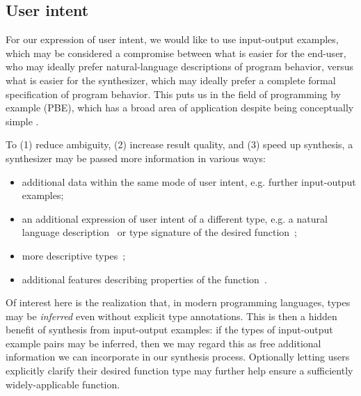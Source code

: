 \documentclass{article} %
\begin{document}

\subsection{User intent}

For our expression of user intent, we would like to use input-output examples,
which may be considered a compromise between what is easier for the end-user,
who may ideally prefer natural-language descriptions of program behavior,
versus what is easier for the synthesizer,
which may ideally prefer a complete formal specification of program behavior.
This puts us in the field of programming by example (PBE),
which has a broad area of application despite being conceptually simple%
.

To (1) reduce ambiguity, (2) increase result quality, and (3) speed up synthesis, a synthesizer may be passed more information in various ways:
\begin{itemize}
    \item additional data within the same mode of user intent, e.g. further input-output examples;
    \item an additional expression of user intent of a different type, e.g. a natural language description~\citep{polosukhin2018neural} or type signature of the desired function~\citep{myth};
    \item more descriptive types~\citep{synquid};
    \item additional features describing properties of the function~\citep{odena2020learning}.
\end{itemize}

Of interest here is the realization that, in modern programming languages, types may be \emph{inferred} even without explicit type annotations.
This is then a hidden benefit of synthesis from input-output examples:
if the types of input-output example pairs may be inferred,
then we may regard this as free additional information we can incorporate in our synthesis process.
    Optionally letting users explicitly clarify their desired function type
    may further help ensure a sufficiently widely-applicable function.
\end{document}
